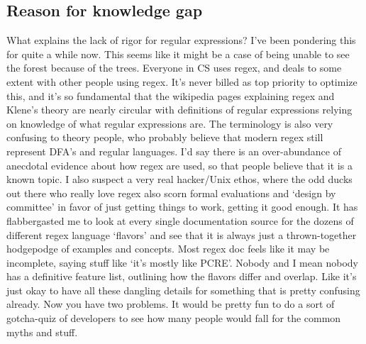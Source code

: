 \subsection{Reason for knowledge gap}
What explains the lack of rigor for regular expressions?  I've been pondering this for quite a while now.  This seems like it might be a case of being unable to see the forest because of the trees.  Everyone in CS uses regex, and deals to some extent with other people using regex.  It's never billed as top priority to optimize this, and it's so fundamental that the wikipedia pages explaining regex and Klene's theory are nearly circular with definitions of regular expressions relying on knowledge of what regular expressions are.  The terminology is also very confusing to theory people, who probably believe that modern regex still represent DFA's and regular languages.  I'd say there is an over-abundance of anecdotal evidence about how regex are used, so that people believe that it is a known topic.  I also suspect a very real hacker/Unix ethos, where the odd ducks out there who really love regex also scorn formal evaluations and `design by committee' in favor of just getting things to work, getting it good enough.  It has flabbergasted me to look at every single documentation source for the dozens of different regex language `flavors' and see that it is always just a thrown-together hodgepodge of examples and concepts.  Most regex doc feels like it may be incomplete, saying stuff like `it's mostly like PCRE'.  Nobody and I mean nobody has a definitive feature list, outlining how the flavors differ and overlap.  Like it's just okay to have all these dangling details for something that is pretty confusing already.  Now you have two problems.  It would be pretty fun to do a sort of gotcha-quiz of developers to see how many people would fall for the common myths and stuff.



